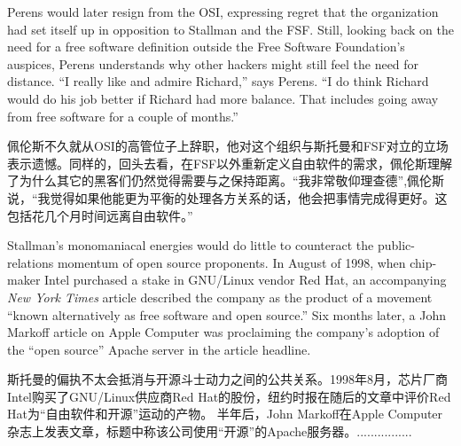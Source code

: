 
\ifdefined\eng
Perens would later resign from the OSI, expressing regret that the organization had set itself up in opposition to Stallman and the FSF. Still, looking back on the need for a free software definition outside the Free Software Foundation's auspices, Perens understands why other hackers might still feel the need for distance. ``I really like and admire Richard,'' says Perens. ``I do think Richard would do his job better if Richard had more balance. That includes going away from free software for a couple of months.''
\fi

\ifdefined\chs
佩伦斯不久就从OSI的高管位子上辞职，他对这个组织与斯托曼和FSF对立的立场表示遗憾。同样的，回头去看，在FSF以外重新定义自由软件的需求，佩伦斯理解了为什么其它的黑客们仍然觉得需要与之保持距离。“我非常敬仰理查德”,佩伦斯说，“我觉得如果他能更为平衡的处理各方关系的话，他会把事情完成得更好。这包括花几个月时间远离自由软件。”
\fi

\ifdefined\eng
Stallman's monomaniacal energies would do little to counteract the public-relations momentum of open source proponents. In August of 1998, when chip-maker Intel purchased a stake in GNU/Linux vendor Red Hat, an accompanying \textit{New York Times} article described the company as the product of a movement ``known alternatively as free software and open source.'' Six months later, a John Markoff article on Apple Computer was proclaiming the company's adoption of the ``open source'' Apache server in the article headline.
\fi

\ifdefined\chs
斯托曼的偏执不太会抵消与开源斗士动力之间的公共关系。1998年8月，芯片厂商Intel购买了GNU/Linux供应商Red Hat的股份，纽约时报在随后的文章中评价Red Hat为“自由软件和开源”运动的产物。 半年后，John Markoff在Apple Computer杂志上发表文章，标题中称该公司使用“开源”的Apache服务器。................
\fi

